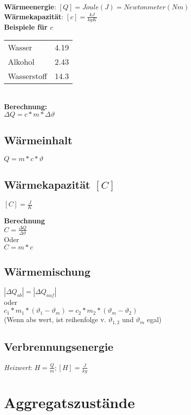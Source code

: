 \documentclass[a4paper]{article}
\begin{document}
\begin{multicols}{3}
  \textbf{Wärmeenergie}: $[Q] = Joule (J) = Newtonmeter (Nm)$\\
  \textbf{Wärmekapazität}: $ [c] = \frac{kJ}{kg K}$\\
  
  \textbf{Beispiele für $ c $}\\ 
  \begin{tabular}{ll}
  	Wasser & 4.19 \\
  	Alkohol & 2.43 \\
  	Wasserstoff & 14.3
  \end{tabular}\\
  
  \textbf{Berechnung:}\\
  $ \Delta Q = c * m * \Delta \vartheta $
  
  \subsection{Wärmeinhalt}
  $ Q = m * c * \vartheta $
  \subsection{Wärmekapazität $[C]$}
  
  $ [C] = \frac{J}{K} $
  
  \textbf{Berechnung}\\
  $ C = \frac{\Delta Q}{\Delta \vartheta} $\\
  
  Oder \\
  
  $ C = m * c $
  
  \subsection{Wärmemischung}
  
  $ |\Delta Q_{ab}| = | \Delta Q_{auf} | $\\
  oder\\
  $c_1 * m_1  * (\vartheta_1 - \vartheta_m) = c_2 * m_2 * (\vartheta_m - \vartheta_2) $\\
  (Wenn abs wert, ist reihenfolge v. $ \vartheta_{1,2}$ und $ \vartheta_m $ egal)
  
  \subsection{Verbrennungsenergie}
  
  \textit{Heizwert}: $ H = \frac{Q}{m}; [H] = \frac{J}{kg} $
  \section{Aggregatszustände}
  

\end{multicols}
\end{document}
